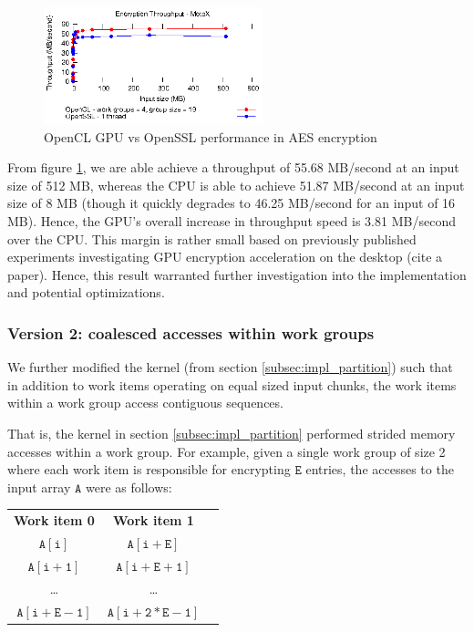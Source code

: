 \documentclass[conference,10pt]{IEEEtran}
\begin{document}
\begin{figure}[!t]
\centering
\includegraphics[width=2.5in]{../final/motox/4.2/opencl_sizes_vs_cpu_sizes.opencl_4G_19L.cpu_1thread.report.eps}
\caption{OpenCL GPU vs OpenSSL performance in AES encryption}
\label{fig:opencl_vs_cpu}
\end{figure}

From figure \ref{fig:opencl_vs_cpu}, we are able achieve a throughput of 55.68 MB/second at an input 
size of 512 MB, whereas the CPU is able to achieve 51.87 MB/second at an input size of 8 MB (though 
it quickly degrades to 46.25 MB/second for an input of 16 MB).  Hence, the GPU's overall increase in 
throughput speed is 3.81 MB/second over the CPU.  This margin is rather small based on previously 
published experiments investigating GPU encryption acceleration on the desktop (cite a paper). 
Hence, this result warranted further investigation into the implementation and potential 
optimizations.

\subsubsection{Version 2: coalesced accesses within work groups}
\label{subsec:impl_coalesce}

We further modified the kernel (from section \ref{subsec:impl_partition}) such that in addition to 
work items operating on equal sized input chunks, the work items within a work group access 
contiguous sequences.  

That is, the kernel in section \ref{subsec:impl_partition} performed strided memory accesses 
\cite{gpu_mem} within a work group.  For example, given a single work group of size 2 where each 
work item is responsible for encrypting $\mathtt{E}$ entries, the accesses to the input array 
$\mathtt{A}$ were as follows:

\begin{table}[h]
\centering
\begin{tabular}{ccc}
    \textbf{Work item 0} & \textbf{Work item 1} \\
    $\mathtt{A[i]}$         & $\mathtt{A[i + E]}$ \\
    $\mathtt{A[i + 1]}$     & $\mathtt{A[i + E + 1]}$ \\
    \ldots       & \ldots \\
    $\mathtt{A[i + E - 1]}$ & $\mathtt{A[i + 2*E - 1]}$ \\
\end{tabular}
\end{table}
\end{document}
